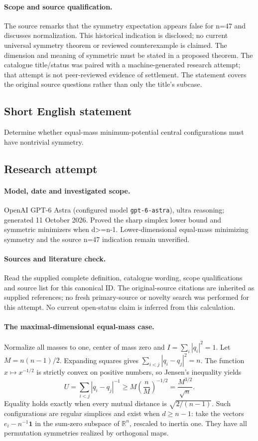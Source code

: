 \documentclass[11pt]{article}
\begin{document}
\paragraph{Scope and source qualification.}The source remarks that the symmetry expectation appears false for n=47 and discusses normalization. This historical indication is disclosed; no current universal symmetry theorem or reviewed counterexample is claimed. The dimension and meaning of symmetric must be stated in a proposed theorem. The catalogue title/status was paired with a machine-generated research attempt; that attempt is not peer-reviewed evidence of settlement. The statement covers the original source questions rather than only the title’s subcase.
\subsection{Short English statement}
Determine whether equal-mass minimum-potential central configurations must have nontrivial symmetry.
\subsection{Research attempt}
\paragraph{Model, date and investigated scope.}
OpenAI GPT-6 Astra (configured model \texttt{gpt-6-astra}), ultra reasoning; generated 11 October 2026. Proved the sharp simplex lower bound and symmetric minimizers when d>=n-1. Lower-dimensional equal-mass minimizing symmetry and the source n=47 indication remain unverified.

\paragraph{Sources and literature check.}
Read the supplied complete definition, catalogue wording, scope qualifications and source list for this canonical ID. The original-source citations are inherited as supplied references; no fresh primary-source or novelty search was performed for this attempt. No current open-status claim is inferred from this calculation.

\paragraph{The maximal-dimensional equal-mass case.}Normalize all masses to one, center of mass zero and \(I=\sum_i|q_i|^2=1\). Let \(M=n(n-1)/2\). Expanding squares gives \(\sum_{i<j}|q_i-q_j|^2=n\). The function \(x\mapsto x^{-1/2}\) is strictly convex on positive numbers, so Jensen's inequality yields
\[U=\sum_{i<j}|q_i-q_j|^{-1}\ge M\left(\frac nM\right)^{-1/2}=\frac{M^{3/2}}{\sqrt n}.
\]
Equality holds exactly when every mutual distance is \(\sqrt{2/(n-1)}\). Such configurations are regular simplices and exist when \(d\ge n-1\): take the vectors \(e_i-n^{-1}\mathbf1\) in the sum-zero subspace of \(\mathbb R^n\), rescaled to inertia one. They have all permutation symmetries realized by orthogonal maps.
\end{document}
